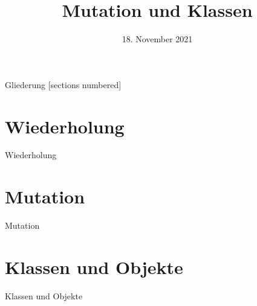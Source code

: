 



\title{Mutation und Klassen}
\date{18. November 2021}


	
\maketitle

\begin{frame}{Gliederung}
	[sections numbered]
	\tableofcontents
\end{frame}

\section{Wiederholung}
\begin{frame}{Wiederholung}
	
\end{frame}


\section{Mutation}
\begin{frame}{Mutation}
	
\end{frame}

\section{Klassen und Objekte}
\begin{frame}{Klassen und Objekte}
	
\end{frame}


